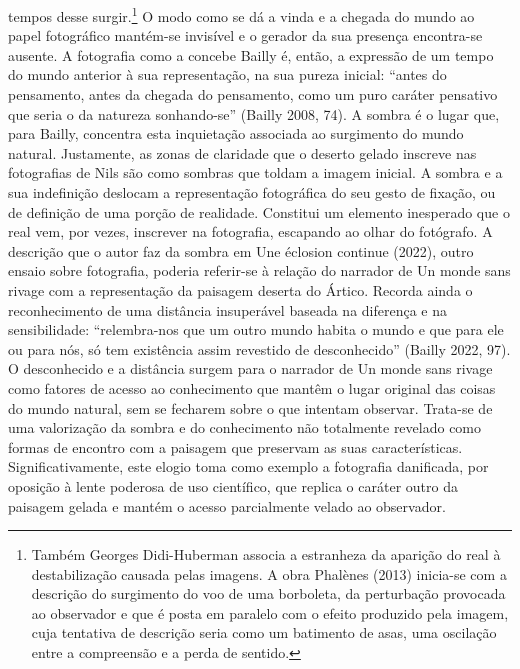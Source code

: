 \documentclass{article}
\begin{document}
tempos desse surgir.\footnote{Também Georges Didi-Huberman associa a estranheza da aparição do real à destabilização causada pelas
imagens. A obra Phalènes (2013) inicia-se com a descrição do surgimento do voo de uma borboleta, da
perturbação provocada ao observador e que é posta em paralelo com o efeito produzido pela imagem,
cuja tentativa de descrição seria como um batimento de asas, uma oscilação entre a compreensão e a
perda de sentido.} O modo como se dá a vinda e a chegada do mundo ao papel
fotográfico mantém-se invisível e o gerador da sua presença encontra-se ausente. A
fotografia como a concebe Bailly é, então, a expressão de um tempo do mundo anterior à sua representação, na sua pureza inicial: “antes do pensamento, antes da chegada do pensamento, como um puro caráter pensativo que seria o da natureza sonhando-se” (Bailly 2008, 74).
A sombra é o lugar que, para Bailly, concentra esta inquietação associada ao
surgimento do mundo natural. Justamente, as zonas de claridade que o deserto gelado inscreve nas fotografias de Nils são como sombras que toldam a imagem inicial.
A sombra e a sua indefinição deslocam a representação fotográfica do seu gesto de
fixação, ou de definição de uma porção de realidade. Constitui um elemento inesperado que o real vem, por vezes, inscrever na fotografia, escapando ao olhar do fotógrafo. A descrição que o autor faz da sombra em Une éclosion continue (2022), outro
ensaio sobre fotografia, poderia referir-se à relação do narrador de Un monde sans
rivage com a representação da paisagem deserta do Ártico. Recorda ainda o reconhecimento de uma distância insuperável baseada na diferença e na sensibilidade: “relembra-nos que um outro mundo habita o mundo e que para ele ou para nós, só tem
existência assim revestido de desconhecido” (Bailly 2022, 97). O desconhecido e a
distância surgem para o narrador de Un monde sans rivage como fatores de acesso
ao conhecimento que mantêm o lugar original das coisas do mundo natural, sem se
fecharem sobre o que intentam observar. Trata-se de uma valorização da sombra e
do conhecimento não totalmente revelado como formas de encontro com a paisagem
que preservam as suas características. Significativamente, este elogio toma como
exemplo a fotografia danificada, por oposição à lente poderosa de uso científico, que
replica o caráter outro da paisagem gelada e mantém o acesso parcialmente velado
ao observador.
\end{document}

